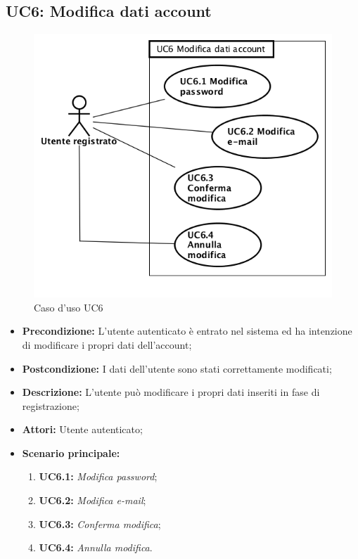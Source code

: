 \newpage
\subsection{ UC6: Modifica dati account}

\begin{figure}[h]
	\begin{center}
	\includegraphics[scale=0.4]{diagram/UC6.png}
	\caption{Caso d'uso UC6}
	\end{center}
\end{figure}
\begin{itemize}
	\item \textbf{Precondizione:} L’utente autenticato è entrato nel sistema ed ha intenzione di modificare i propri dati dell’account;
	\item \textbf{Postcondizione:} I dati dell’utente sono stati correttamente modificati;
	\item \textbf{Descrizione:} L’utente può modificare i propri dati inseriti in fase di registrazione;
	\item \textbf{Attori:} Utente autenticato;
	\item \textbf{Scenario principale:}
	\begin{enumerate}
		\item \textbf{ UC6.1:} \textit{ Modifica password};
		\item \textbf{ UC6.2:} \textit{ Modifica e-mail};
		\item \textbf{ UC6.3:} \textit{ Conferma modifica};
		\item \textbf{ UC6.4:} \textit{ Annulla modifica}.
	\end{enumerate}
\end{itemize}

